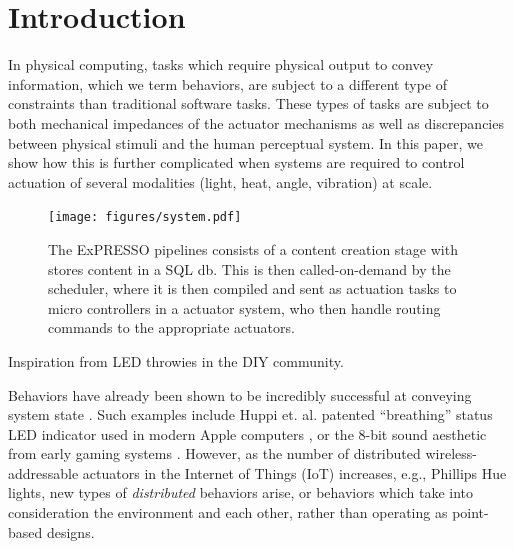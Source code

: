 \documentclass{sigchi}
\begin{document}


\section{Introduction}

  In physical computing, tasks which require physical output to convey information, which we term behaviors, are subject to a different type of constraints than traditional software tasks. These types of tasks are subject to both mechanical impedances of the actuator mechanisms as well as discrepancies between physical stimuli and the human perceptual system. In this paper, we show how this is further complicated when systems are required to control actuation of several modalities (light, heat, angle, vibration) at scale. 


    \begin{figure}[t]
      \centering
      \texttt{[image: figures/system.pdf]}
      \caption{ The ExPRESSO pipelines consists of a content creation stage with stores content in a SQL db. This is then called-on-demand by the scheduler, where it is then compiled and sent as actuation tasks to micro controllers in a actuator system, who then handle routing commands to the appropriate actuators. }
        \label{fig:system} 
    \end{figure}
 Inspiration from LED throwies in the DIY community. 




 Behaviors have already been shown to be incredibly successful at conveying system state \cite{harrison_unlocking_2012,kuznetsov_red_2011}. Such examples include Huppi et. al. patented ``breathing'' status LED indicator used in modern Apple computers \cite{huppi_breathing_2003}, or the 8-bit sound aesthetic from early gaming systems \cite{kaliakatsospapakostas_interactive_2012}. 
 However, as the number of distributed wireless-addressable actuators in the Internet of Things (IoT) increases, e.g., Phillips Hue lights, new types of \textit{distributed} behaviors arise, or behaviors which take into consideration the environment and each other, rather than operating as point-based designs. 
\end{document}
